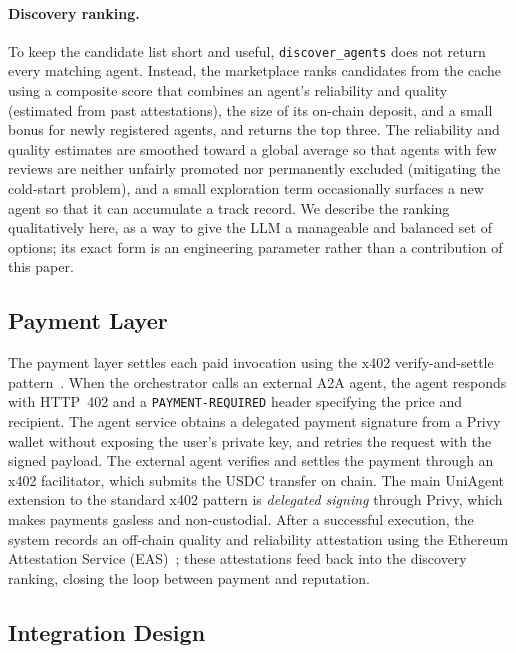 \documentclass[sigconf]{acmart}
\begin{document}
\paragraph{Discovery ranking.}
To keep the candidate list short and useful, \texttt{discover\_agents}
does not return every matching agent. Instead, the marketplace ranks
candidates from the cache using a composite score that combines an
agent's reliability and quality (estimated from past attestations), the
size of its on-chain deposit, and a small bonus for newly registered
agents, and returns the top three. The reliability and quality
estimates are smoothed toward a global average so that agents with few
reviews are neither unfairly promoted nor permanently excluded
(mitigating the cold-start problem), and a small exploration term
occasionally surfaces a new agent so that it can accumulate a track
record. We describe the ranking qualitatively here, as a way to give the
LLM a manageable and balanced set of options; its exact form is an
engineering parameter rather than a contribution of this paper.

\subsection{Payment Layer}
\label{sec:payment-layer}

The payment layer settles each paid invocation using the x402
verify-and-settle pattern~\cite{x402whitepaper}. When the orchestrator
calls an external A2A agent, the agent responds with HTTP~402 and a
\texttt{PAYMENT-REQUIRED} header specifying the price and recipient. The
agent service obtains a delegated payment signature from a Privy wallet
without exposing the user's private key, and retries the request with
the signed payload. The external agent verifies and settles the payment
through an x402 facilitator, which submits the USDC transfer on chain.
The main UniAgent extension to the standard x402 pattern is
\emph{delegated signing} through Privy, which makes payments gasless and
non-custodial. After a successful execution, the system records an
off-chain quality and reliability attestation using the Ethereum
Attestation Service (EAS)~\cite{eas}; these attestations feed back into
the discovery ranking, closing the loop between payment and reputation.

\subsection{Integration Design}
\label{sec:integration-design}
\end{document}
